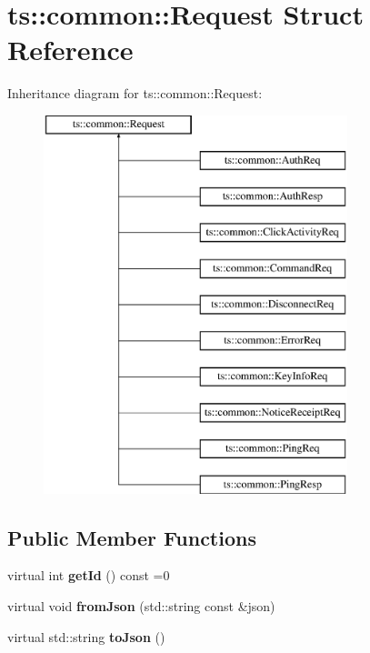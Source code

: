 \hypertarget{structts_1_1common_1_1_request}{}\section{ts\+:\+:common\+:\+:Request Struct Reference}
\label{structts_1_1common_1_1_request}
Inheritance diagram for ts\+:\+:common\+:\+:Request\+:\begin{figure}[H]
\begin{center}
\leavevmode
\includegraphics[height=11.000000cm]{structts_1_1common_1_1_request}
\end{center}
\end{figure}
\subsection*{Public Member Functions}
\begin{DoxyCompactItemize}
\item 
\mbox{\label{structts_1_1common_1_1_request_adc39e5105b8968fad562455f0c1cd8dc}} 
virtual int {\bfseries get\+Id} () const =0
\item 
\mbox{\label{structts_1_1common_1_1_request_ae001c883e781956e056ce7ea1ad0059a}} 
virtual void {\bfseries from\+Json} (std\+::string const \&json)
\item 
\mbox{\label{structts_1_1common_1_1_request_acd1c4afcfd91063a01ea181c05e6031e}} 
virtual std\+::string {\bfseries to\+Json} ()
\end{DoxyCompactItemize}
